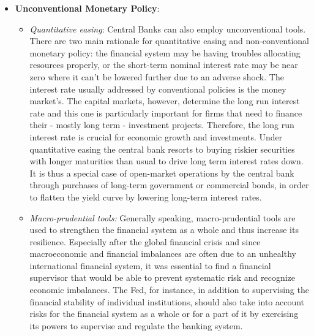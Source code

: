 \documentclass[11pt,a4paper,oneside]{book}
\begin{document}
\begin{itemize}
  \item \textbf{Unconventional Monetary Policy}: 
  \begin{itemize}
    \item \textit{Quantitative easing}: Central Banks can also employ unconventional tools. There are two main rationale for quantitative easing and non-conventional monetary policy: the financial system may be having troubles allocating resources properly, or the short-term nominal interest rate may be near zero where it can't be lowered further due to an adverse shock. The interest rate usually addressed by conventional policies is the money market's. The capital markets, however, determine the long run interest rate and this one is particularly important for firms that need to finance their - mostly long term - investment projects. Therefore, the long run interest rate is crucial for economic growth and investments. Under quantitative easing the central bank resorts to buying riskier securities with longer maturities than usual to drive long term interest rates down. It is thus a special case of open-market operations by the central bank through purchases of long-term government or commercial bonds, in order to flatten the yield curve by lowering long-term interest rates.
    \item \textit{Macro-prudential tools:} Generally speaking, macro-prudential tools are used to strengthen the financial system as a whole and thus increase its resilience. Especially after the global financial crisis and since macroeconomic and financial imbalances are often due to an unhealthy international financial system, it was essential to find a financial supervisor that would be able to prevent systematic risk and recognize economic imbalances. The Fed, for instance, in addition to supervising the financial stability of individual institutions, should also take into account risks for the financial system as a whole or for a part of it by exercising its powers to supervise and regulate the banking system.
  \end{itemize}
\end{itemize}
\end{document}
